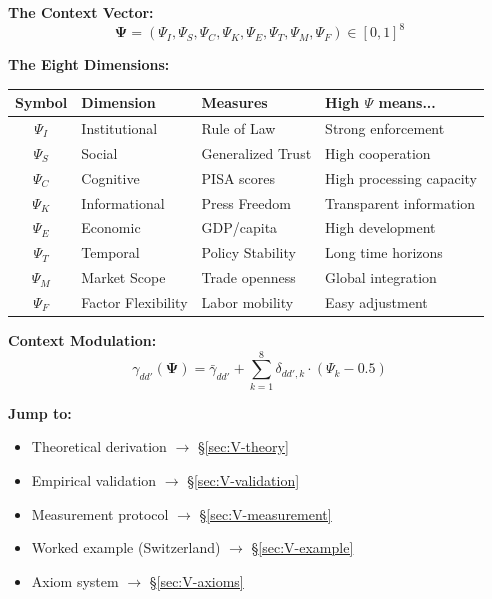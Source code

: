 \begin{tcolorbox}[colback=yellow!10!white, colframe=yellow!75!black, 
    title=\textbf{Quick Reference}]

\textbf{The Context Vector:}
\[
\boldsymbol{\Psi} = (\Psi_I, \Psi_S, \Psi_C, \Psi_K, \Psi_E, \Psi_T, \Psi_M, \Psi_F) \in [0,1]^8
\]

\textbf{The Eight Dimensions:}
\begin{center}
\small
\begin{tabular}{@{}clll@{}}
\toprule
\textbf{Symbol} & \textbf{Dimension} & \textbf{Measures} & \textbf{High $\Psi$ means...} \\
\midrule
$\Psi_I$ & Institutional & Rule of Law & Strong enforcement \\
$\Psi_S$ & Social & Generalized Trust & High cooperation \\
$\Psi_C$ & Cognitive & PISA scores & High processing capacity \\
$\Psi_K$ & Informational & Press Freedom & Transparent information \\
$\Psi_E$ & Economic & GDP/capita & High development \\
$\Psi_T$ & Temporal & Policy Stability & Long time horizons \\
$\Psi_M$ & Market Scope & Trade openness & Global integration \\
$\Psi_F$ & Factor Flexibility & Labor mobility & Easy adjustment \\
\bottomrule
\end{tabular}
\end{center}

\textbf{Context Modulation:}
\[
\gamma_{dd'}(\boldsymbol{\Psi}) = \bar{\gamma}_{dd'} + \sum_{k=1}^{8} \delta_{dd',k} \cdot (\Psi_k - 0.5)
\]

\textbf{Jump to:}
\begin{itemize}[nosep]
    \item Theoretical derivation $\rightarrow$ \S\ref{sec:V-theory}
    \item Empirical validation $\rightarrow$ \S\ref{sec:V-validation}
    \item Measurement protocol $\rightarrow$ \S\ref{sec:V-measurement}
    \item Worked example (Switzerland) $\rightarrow$ \S\ref{sec:V-example}
    \item Axiom system $\rightarrow$ \S\ref{sec:V-axioms}
\end{itemize}

\end{tcolorbox}



